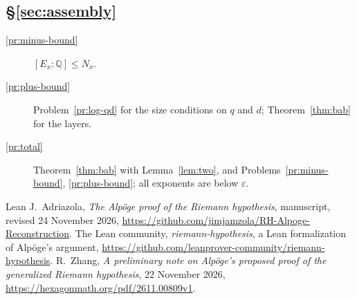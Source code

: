 \documentclass[reqno]{amsart}
\theoremstyle{definition}
\theoremstyle{plain}
\theoremstyle{remark}
\newcommand{\Q}{\mathbb{Q}}
\begin{document}
\subsection*{\S\ref{sec:assembly}}
\begin{description}
\item[\ref{pr:minus-bound}] \([E_x:\Q]\le N_x\).
\item[\ref{pr:plus-bound}] Problem~\ref{pr:log-qd} for the size conditions on \(q\) and \(d\); Theorem~\ref{thm:bab} for the layers.
\item[\ref{pr:total}] Theorem~\ref{thm:bab} with Lemma~\ref{lem:two}, and Problems~\ref{pr:minus-bound}, \ref{pr:plus-bound}; all exponents are below \(\varepsilon\).
\end{description}

\begin{thebibliography}{Lean}
 J.~Adriazola, \emph{The Alp\"oge proof of the Riemann hypothesis}, manuscript, revised 24 November 2026, \url{https://github.com/jimjamzola/RH-Alpoge-Reconstruction}.
 The Lean community, \emph{riemann-hypothesis}, a Lean formalization of Alp\"oge's argument, \url{https://github.com/leanprover-community/riemann-hypothesis}.
 R.~Zhang, \emph{A preliminary note on Alp\"oge's proposed proof of the generalized Riemann hypothesis}, 22 November 2026, \url{https://hexagonmath.org/pdf/2611.00809v1}.
\end{thebibliography}
\end{document}
